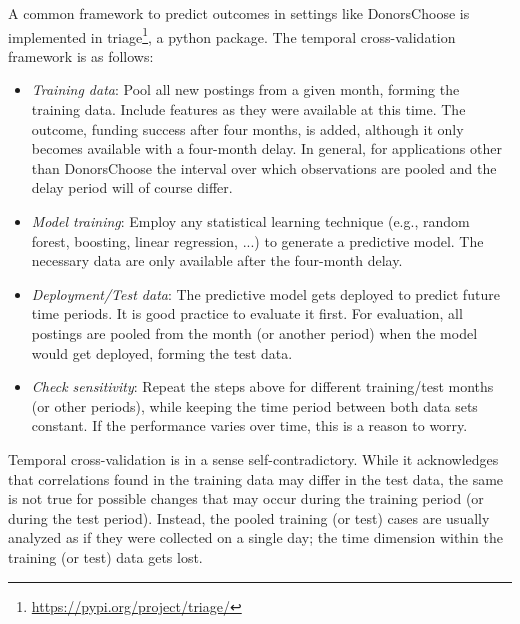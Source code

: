\documentclass{article}
\begin{document}
A common framework to predict outcomes in settings like DonorsChoose is implemented in triage\footnote{\url{https://pypi.org/project/triage/}}, a python package. The temporal cross-validation framework is as follows: 
\begin{itemize}
    \item \textit{Training data}: Pool all new postings from a given month, forming the training data. Include features as they were available at this time. The outcome, funding success after four months, is added, although it only becomes available with a four-month delay. In general, for applications other than DonorsChoose the interval over which observations are pooled and the delay period will of course differ.
    \item \textit{Model training}: Employ any statistical learning technique (e.g., random forest, boosting, linear regression, ...) to generate a predictive model. The necessary data are only available after the four-month delay.
    \item \textit{Deployment/Test data}: The predictive model gets deployed to predict future time periods. It is good practice to evaluate it first. For evaluation, all postings are pooled from the month (or another period) when the model would get deployed, forming the test data.
    \item \textit{Check sensitivity}: Repeat the steps above for different training/test months (or other periods), while keeping the time period between both data sets constant. If the performance varies over time, this is a reason to worry.
\end{itemize}

Temporal cross-validation is in a sense self-contradictory. While it acknowledges that correlations found in the training data may differ in the test data, the same is not true for possible changes that may occur during the training period (or during the test period). Instead, the pooled training (or test) cases are usually analyzed as if they were collected on a single day; the time dimension within the training (or test) data gets lost.
\end{document}

